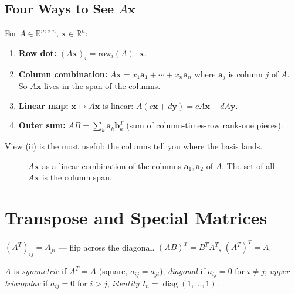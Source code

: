 \subsection{Four Ways to See $A\mathbf{x}$}
For $A\in\mathbb{R}^{m\times n}$, $\mathbf{x}\in\mathbb{R}^n$:
\begin{enumerate}[label=(\roman*)]
    \item \textbf{Row dot:} $(A\mathbf{x})_i=\text{row}_i(A)\cdot\mathbf{x}$.
    \item \textbf{Column combination:} $A\mathbf{x}=x_1\mathbf{a}_1+\cdots+x_n\mathbf{a}_n$ where $\mathbf{a}_j$ is column $j$ of $A$. So $A\mathbf{x}$ lives in the span of the columns.
    \item \textbf{Linear map:} $\mathbf{x}\mapsto A\mathbf{x}$ is linear: $A(c\mathbf{x}+d\mathbf{y})=cA\mathbf{x}+dA\mathbf{y}$.
    \item \textbf{Outer sum:} $AB=\sum_{k}\mathbf{a}_k\mathbf{b}_k^T$ (sum of column-times-row rank-one pieces).
\end{enumerate}
View (ii) is the most useful: the columns tell you where the basis lands.

\begin{figure}[h]
\centering
{}
\caption{$A\mathbf{x}$ as a linear combination of the columns $\mathbf{a}_1,\mathbf{a}_2$ of $A$. The set of all $A\mathbf{x}$ is the column span.}
\label{fig:col-combo}
\end{figure}

\section{Transpose and Special Matrices}
\label{sec:transpose}
\begin{definition}[Transpose]
$(A^T)_{ij}=A_{ji}$ --- flip across the diagonal. $(AB)^T=B^TA^T$, $(A^T)^T=A$.
\end{definition}
$A$ is \emph{symmetric} if $A^T=A$ (square, $a_{ij}=a_{ji}$); \emph{diagonal} if $a_{ij}=0$ for $i\neq j$; \emph{upper triangular} if $a_{ij}=0$ for $i>j$; \emph{identity} $I_n=\operatorname{diag}(1,\dots,1)$.

